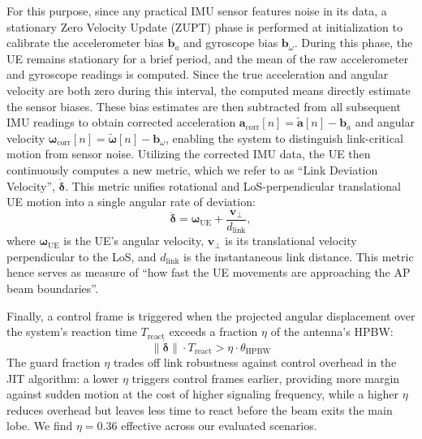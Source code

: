 \documentclass[fleqn,10pt]{wlscirep}
\begin{document}
For this purpose, since any practical IMU sensor features noise in its data, a stationary Zero Velocity Update (ZUPT) phase is performed at initialization to calibrate the accelerometer bias $\mathbf{b}_a$ and gyroscope bias $\mathbf{b}_\omega$. During this phase, the UE remains stationary for a brief period, and the mean of the raw accelerometer and gyroscope readings is computed. Since the true acceleration and angular velocity are both zero during this interval, the computed means directly estimate the sensor biases. These bias estimates are then subtracted from all subsequent IMU readings to obtain corrected acceleration $\mathbf{a}_{\text{corr}}[n] = \tilde{\mathbf{a}}[n] - \mathbf{b}_a$ and angular velocity $\boldsymbol{\omega}_{\text{corr}}[n] = \tilde{\boldsymbol{\omega}}[n] - \mathbf{b}_\omega$, enabling the system to distinguish link-critical motion from sensor noise. Utilizing the corrected IMU data, the UE then continuously computes a new metric, which we refer to as ``Link Deviation Velocity'', $\dot{\boldsymbol{\delta}}$. This metric unifies rotational and LoS-perpendicular translational UE motion into a single angular rate of deviation:
\begin{equation}
    \dot{\boldsymbol{\delta}} = \boldsymbol{\omega}_{\text{UE}} + \frac{\mathbf{v}_{\perp}}{d_{\text{link}}},
    \label{eq:link_deviation_velocity}
\end{equation}
where $\boldsymbol{\omega}_{\text{UE}}$ is the UE's angular velocity, $\mathbf{v}_{\perp}$ is its translational velocity perpendicular to the LoS, and $d_{\text{link}}$ is the instantaneous link distance. This metric hence serves as measure of ``how fast the UE movements are approaching the AP beam boundaries''.

Finally, a control frame is triggered when the projected angular displacement over the system's reaction time $T_{\text{react}}$ exceeds a fraction $\eta$ of the antenna's HPBW:
\begin{equation}
    \|\dot{\boldsymbol{\delta}}\| \cdot T_{\text{react}} > \eta \cdot \theta_{\text{HPBW}}
\end{equation}
The guard fraction $\eta$ trades off link robustness against control overhead in the JIT algorithm: a lower $\eta$ triggers control frames earlier, providing more margin against sudden motion at the cost of higher signaling frequency, while a higher $\eta$ reduces overhead but leaves less time to react before the beam exits the main lobe. We find $\eta = 0.36$ effective across our evaluated scenarios.
\end{document}
